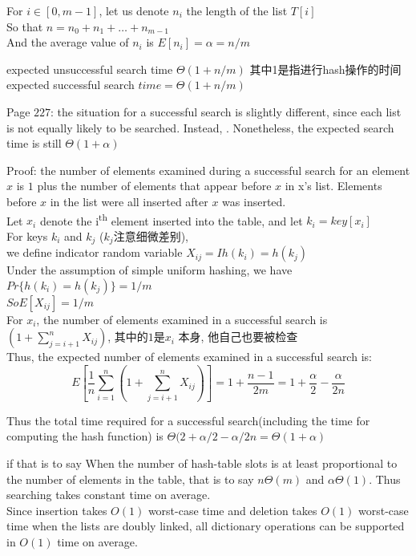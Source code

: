 \documentclass{article}
\begin{document}
For $i \in [0,m-1]$, let us denote $n_i$ the length of the list $T[i]$\\
So that $n=n_0 + n_1 + \ldots + n_{m-1}$\\
And the average value of $n_i$ is $E[n_i]=\alpha=n/m$

expected unsuccessful search time $\Theta(1+n/m)$  其中1是指进行hash操作的时间\\
expected successful search $time =\Theta(1+n/m)$

Page $227$: the situation for a successful search is slightly different, since each list is not equally likely to be searched. Instead, . Nonetheless, the expected search time is still $\Theta(1+\alpha)$\par
Proof: the number of elements examined during a successful search for an element $x$ is $1$ plus the number of elements that appear before $x$ in x's list. Elements before $x$ in the list were all inserted after $x$ was inserted.\\
Let $x_i$ denote the i\textsuperscript{th} element inserted into the table, and let $k_i=key[x_i]$\\
For keys $k_i$ and $k_j$ ($k_j$注意细微差别), \\
we define indicator random variable $X_{ij}=I{h(k_i)=h(k_j)}$\\
Under the assumption of simple uniform hashing, we have $Pr\{h(k_i)=h(k_j)\}=1/m$\\
$So E[X_{ij}]=1/m$\\
For $x_i$, the number of elements examined in a successful search is $(1+\sum_{j=i+1}^n X_{ij})$, 其中的$1$是$x_i$ 本身, 他自己也要被检查\\
Thus, the expected number of elements examined in a successful search is:
$$
E[\frac{1}{n} \sum_{i=1}^n (1 + \sum_{j = i + 1}^n X_{ij})]
= 1 + \frac{n-1}{2m}
= 1 + \frac{\alpha}{2} - \frac{\alpha}{2n}
$$

Thus the total time required for a successful search(including the time for computing the hash function) is $\Theta(2 + \alpha/2 - \alpha/{2n}=\Theta(1+\alpha)$

if that is to say When the number of hash-table slots is at least proportional to the number of elements in the table, that is to say $n\Theta(m)$ and $ \alpha \Theta(1)$. Thus searching takes constant time on average. \\
Since insertion takes $O(1)$ worst-case time and deletion takes $O(1)$ worst-case time when the lists are doubly linked, all dictionary operations can be supported in $O(1)$ time on average.
\end{document}
